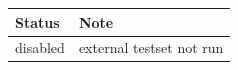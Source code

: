 \begin{tabular}{ll}
\toprule
Status & Note \\
\midrule
disabled & external testset not run \\
\bottomrule
\end{tabular}